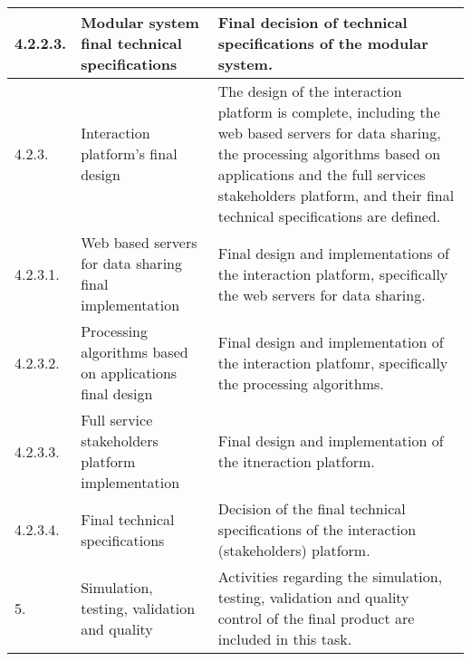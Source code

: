 \begin{longtable}[H]{l >{\raggedright\arraybackslash}p{4cm} p{8cm}}
	\midrule
	
	4.2.2.3. & Modular system final technical specifications & Final decision of technical specifications of the modular system.\vspace{0.2cm} \\
	
	\midrule
	
	4.2.3. & Interaction platform's final design & The design of the interaction platform is complete, including the web based servers for data sharing, the processing algorithms based on applications and the full services stakeholders platform, and their final technical specifications are defined.\vspace{0.2cm} \\
	
	\midrule
	
	4.2.3.1. & Web based servers for data sharing final implementation & Final design and implementations of the interaction platform, specifically the web servers for data sharing.\vspace{0.2cm} \\
	
	\midrule
	
	4.2.3.2. & Processing algorithms based on applications final design & Final design and implementation of the interaction platfomr, specifically the processing algorithms.\vspace{0.2cm} \\
	
	\midrule
	
	4.2.3.3. & Full service stakeholders platform implementation & Final design and implementation of the itneraction platform.\vspace{0.2cm} \\
	
	\midrule
	
	4.2.3.4. & Final technical specifications & Decision of the final technical specifications of the interaction (stakeholders) platform.\vspace{0.2cm} \\
	
	\midrule
	
	5. & Simulation, testing, validation and quality & Activities regarding the simulation, testing, validation and quality control of the final product are included in this task.\vspace{0.2cm} \\
	
	\midrule
	

\end{longtable}

